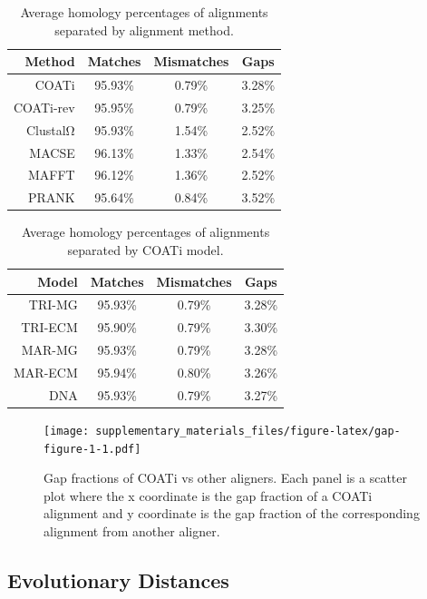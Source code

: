 \documentclass[
]{article}
\begin{document}
\begin{table}[H]

\caption{\label{tab:gap-table-5}Average homology percentages of alignments separated by alignment method.}
\centering
\begin{tabular}[t]{rccc}
\toprule
Method & Matches & Mismatches & Gaps\\
\midrule
COATi & 95.93\% & 0.79\% & 3.28\%\\
\addlinespace
COATi-rev & 95.95\% & 0.79\% & 3.25\%\\
\addlinespace
ClustalΩ & 95.93\% & 1.54\% & 2.52\%\\
\addlinespace
MACSE & 96.13\% & 1.33\% & 2.54\%\\
\addlinespace
MAFFT & 96.12\% & 1.36\% & 2.52\%\\
\addlinespace
PRANK & 95.64\% & 0.84\% & 3.52\%\\
\bottomrule
\end{tabular}
\end{table}

\begin{table}[H]

\caption{\label{tab:gap-table-6}Average homology percentages of alignments separated by COATi model.}
\centering
\begin{tabular}[t]{rccc}
\toprule
Model & Matches & Mismatches & Gaps\\
\midrule
TRI-MG & 95.93\% & 0.79\% & 3.28\%\\
\addlinespace
TRI-ECM & 95.90\% & 0.79\% & 3.30\%\\
\addlinespace
MAR-MG & 95.93\% & 0.79\% & 3.28\%\\
\addlinespace
MAR-ECM & 95.94\% & 0.80\% & 3.26\%\\
\addlinespace
DNA & 95.93\% & 0.79\% & 3.27\%\\
\bottomrule
\end{tabular}
\end{table}

\begin{figure}
\centering
\texttt{[image: supplementary\_materials\_files/figure-latex/gap-figure-1-1.pdf]}
\caption{\label{fig:gap-figure-1}Gap fractions of COATi vs other aligners. Each panel is a scatter plot where the x coordinate is the gap fraction of a COATi alignment and y coordinate is the gap fraction of the corresponding alignment from another aligner.}
\end{figure}

\newpage

\hypertarget{evolutionary-distances}{%
\subsection{Evolutionary Distances}\label{evolutionary-distances}}
\end{document}
